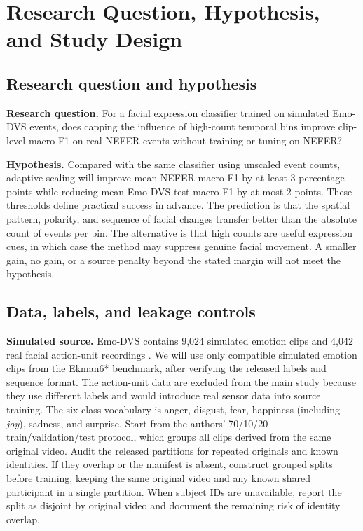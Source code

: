 \section{Research Question, Hypothesis, and Study Design}
\label{sec:design}

\subsection{Research question and hypothesis}
\textbf{Research question.} For a facial expression classifier trained on simulated Emo-DVS events, does capping the influence of high-count temporal bins improve clip-level macro-F1 on real NEFER events without training or tuning on NEFER?

\textbf{Hypothesis.} Compared with the same classifier using unscaled event counts, adaptive scaling will improve mean NEFER macro-F1 by at least 3 percentage points while reducing mean Emo-DVS test macro-F1 by at most 2 points. These thresholds define practical success in advance. The prediction is that the spatial pattern, polarity, and sequence of facial changes transfer better than the absolute count of events per bin. The alternative is that high counts are useful expression cues, in which case the method may suppress genuine facial movement. A smaller gain, no gain, or a source penalty beyond the stated margin will not meet the hypothesis.

\subsection{Data, labels, and leakage controls}
\textbf{Simulated source.} Emo-DVS contains 9,024 simulated emotion clips and 4,042 real facial action-unit recordings \cite{chen2026}. We will use only compatible simulated emotion clips from the Ekman6* benchmark, after verifying the released labels and sequence format. The action-unit data are excluded from the main study because they use different labels and would introduce real sensor data into source training. The six-class vocabulary is anger, disgust, fear, happiness (including \emph{joy}), sadness, and surprise. Start from the authors' 70/10/20 train/validation/test protocol, which groups all clips derived from the same original video. Audit the released partitions for repeated originals and known identities. If they overlap or the manifest is absent, construct grouped splits before training, keeping the same original video and any known shared participant in a single partition. When subject IDs are unavailable, report the split as disjoint by original video and document the remaining risk of identity overlap.

